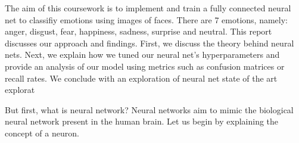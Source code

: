 The aim of this coursework is to implement and train a fully connected neural net to classifiy emotions using images of faces.
There are 7 emotions, namely: anger, disgust, fear, happiness, sadness, surprise and neutral.
This report discusses our approach and findings.
First, we discuss the theory behind neural nets.
Next, we explain how we tuned our neural net's hyperparameters
and provide an analysis of our model using metrics such as confusion matrices or recall rates.
We conclude with an exploration of neural net state of the art explorat

But first, what is neural network?
Neural networks aim to mimic the biological neural network present in the human brain.
Let us begin by explaining the concept of a neuron.

\begin{figure}[!ht]
    \centering
    \qquad
\end{figure}

